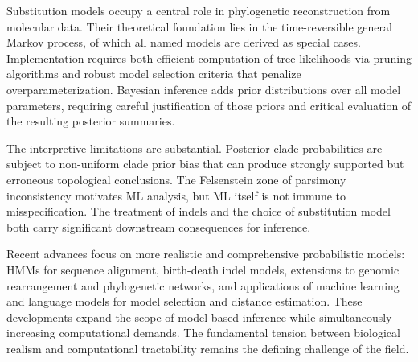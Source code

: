 Substitution models occupy a central role in phylogenetic reconstruction from molecular data. Their theoretical foundation lies in the time-reversible general Markov process, of which all named models are derived as special cases. Implementation requires both efficient computation of tree likelihoods via pruning algorithms and robust model selection criteria that penalize overparameterization. Bayesian inference adds prior distributions over all model parameters, requiring careful justification of those priors and critical evaluation of the resulting posterior summaries.

The interpretive limitations are substantial. Posterior clade probabilities are subject to non-uniform clade prior bias that can produce strongly supported but erroneous topological conclusions. The Felsenstein zone of parsimony inconsistency motivates ML analysis, but ML itself is not immune to misspecification. The treatment of indels and the choice of substitution model both carry significant downstream consequences for inference.

Recent advances focus on more realistic and comprehensive probabilistic models: HMMs for sequence alignment, birth-death indel models, extensions to genomic rearrangement and phylogenetic networks, and applications of machine learning and language models for model selection and distance estimation. These developments expand the scope of model-based inference while simultaneously increasing computational demands. The fundamental tension between biological realism and computational tractability remains the defining challenge of the field.

